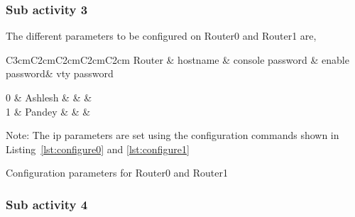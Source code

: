 \documentclass{lab_sheet}
\newcommand{\parameter}[1]{
    \begin{tabular}{C{3cm}C{2cm}C{2cm}C{2cm}C{2cm}}
        \toprule
        Router & hostname & console password & enable password& vty password\\
        \midrule
          #1 
          \bottomrule
       \end{tabular}
}
\begin{document}
                \subsubsection*{Sub activity 3}
    The different parameters to be configured on Router0 and Router1 are,
    \begin{table}[H]
        \centering
        \begin{threeparttable}
        \parameter{
        0 & Ashlesh &  & \multirow{ 2}{*}{407} & \multirow{2}{*}{pandey}\\
        1 & Pandey & & & \\
       }
  \begin{tablenotes}
    \small
    \item Note: The ip parameters are set using the configuration commands shown in Listing~\ref{lst:configure0} and \ref{lst:configure1}
  \end{tablenotes}
  \caption{Configuration parameters for Router0 and Router1}
  \label{tbl:parameter}
        \end{threeparttable}
    \end{table}
    \begin{mdframed}[backgroundcolor=bg,innerbottommargin=-2.5em]
        
          \end{mdframed}
          \begin{mdframed}[backgroundcolor=bg,innerbottommargin=-2.5em]
              
                \end{mdframed}
                \subsubsection*{Sub activity 4}
    
\end{document}
